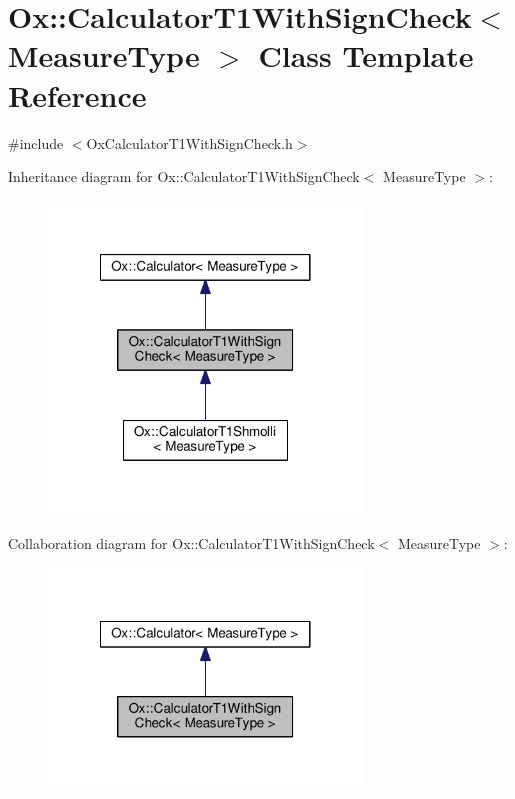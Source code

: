 \hypertarget{class_ox_1_1_calculator_t1_with_sign_check}{\section{Ox\-:\-:Calculator\-T1\-With\-Sign\-Check$<$ Measure\-Type $>$ Class Template Reference}
\label{class_ox_1_1_calculator_t1_with_sign_check}
}


{\ttfamily \#include $<$Ox\-Calculator\-T1\-With\-Sign\-Check.\-h$>$}



Inheritance diagram for Ox\-:\-:Calculator\-T1\-With\-Sign\-Check$<$ Measure\-Type $>$\-:
\nopagebreak
\begin{figure}[H]
\begin{center}
\leavevmode
\includegraphics[width=236pt]{class_ox_1_1_calculator_t1_with_sign_check__inherit__graph}
\end{center}
\end{figure}


Collaboration diagram for Ox\-:\-:Calculator\-T1\-With\-Sign\-Check$<$ Measure\-Type $>$\-:
\nopagebreak
\begin{figure}[H]
\begin{center}
\leavevmode
\includegraphics[width=236pt]{class_ox_1_1_calculator_t1_with_sign_check__coll__graph}
\end{center}
\end{figure}
